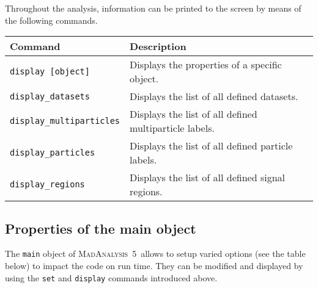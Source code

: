 \documentclass[a4paper]{article}
\newcommand{\MA}{\textsc{MadAnalysis}~5}
\begin{document}
Throughout the analysis, information can be printed to the screen by means of
the following commands.
\renewcommand{\arraystretch}{1.2}%
\begin{center}\begin{tabular}{l p{7.70cm}}
\hline
Command & Description\\
\hline
\color{ao} \verb+display [object]+       & Displays the properties of a specific object.\\
\color{ao} \verb+display_datasets+       & Displays the list of all defined datasets.\\
\color{ao} \verb+display_multiparticles+ &
   Displays the list of all defined multiparticle labels.\\
\color{ao} \verb+display_particles+      &
   Displays the list of all defined particle labels.\\
\color{ao} \verb+display_regions+        &
   Displays the list of all defined signal regions.\\
\hline
\end{tabular}
\end{center}
\newpage
\begin{shaded}
\section{\Large Properties of the main object}
\end{shaded}


The \verb+main+ object of \MA\ allows to setup varied options (see the table
below) to impact the code on run time. They can be modified and
displayed by using the \verb+set+ and \verb+display+ commands introduced above.\\
\end{document}
